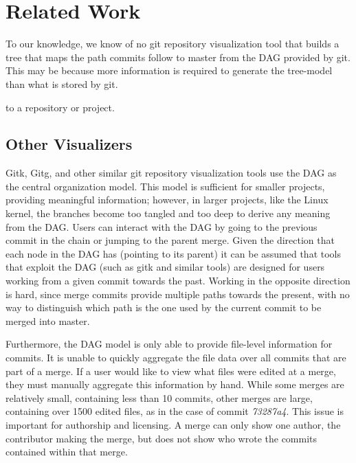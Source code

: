 \documentclass[conference, draftclsnofoot, draft]{IEEEtran}
\begin{document}
\section{Related Work}

To our knowledge, we know of no git repository visualization tool that builds
a tree that maps the path commits follow to master
from the DAG provided by git. This may be because more information is required
to generate the tree-model than what is stored by git. %

to a repository or project.

\subsection{Other Visualizers}

Gitk, Gitg, and other similar git repository visualization tools use the DAG as the
central organization model. This model is sufficient for smaller projects, providing
meaningful information; however, in larger projects, like the Linux kernel, the
branches become too tangled and too deep to derive any meaning from the DAG. Users
can interact with the DAG by going to the previous commit in the chain or jumping to
the parent merge. Given the direction that each node in the DAG has (pointing to its parent)
it can be assumed that tools that exploit the DAG (such as gitk and similar tools) are designed for users
working from a given commit towards the past. Working in the opposite direction is hard, since merge commits provide multiple paths towards the present, with no
way to distinguish which path is the one used by the current commit to be merged into master.

Furthermore, the DAG model is only able to provide file-level information for
commits. It is unable to quickly aggregate the file data over all commits that
are part of a merge. If a user would like to view what files were edited at a merge,
they must manually aggregate this information by hand. While some merges are
relatively small, containing less than 10 commits, other merges are large,
containing over 1500 edited files, as in the case of commit \textit{73287a4}. This
issue is important for authorship and licensing. A merge can only show one author,
the contributor making the merge, but does not show who wrote the commits contained
within that merge.
\end{document}
